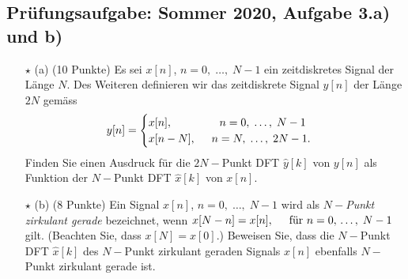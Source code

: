 \documentclass[11pt]{article}
\begin{document}
\subsection*{Prüfungsaufgabe: Sommer 2020, Aufgabe 3.a) und b)}
\vspace*{-0.5cm}
\begin{itemize}
    \item[$\star$ (a)] (10 Punkte) Es sei $x[n]$, $n=0, \; \dots, \; N-1$ ein zeitdiskretes Signal der Länge $N$. Des Weiteren definieren wir das zeitdiskrete Signal $y[n]$ der Länge $2N$ gemäss
    $$ y[n] = \begin{cases}
        x[n], \hspace{1.5cm} n = 0, \; \dots, \; N-1 \\
        x[n-N], \hspace{0.5cm} n = N, \; \dots, \; 2N-1.
    \end{cases} $$
    Finden Sie einen Ausdruck für die $2N-$Punkt DFT $\hat{y}[k]$ von $y[n]$ als Funktion der $N-$Punkt DFT $\hat{x}[k]$ von $x[n]$.
    \item[$\star$ (b)] (8 Punkte) Ein Signal  $x[n]$, $n=0, \; \dots, \; N-1$ wird als $N-$\textit{Punkt zirkulant gerade} bezeichnet, wenn $x[N-n] = x[n], \hspace{0.5cm} \text{für } n= 0, \, \dots, \; N-1$ gilt. (Beachten Sie, dass $x[N] = x[0]$.) Beweisen Sie, dass die $N-$Punkt DFT $\hat{x}[k]$ des $N-$Punkt zirkulant geraden Signals $x[n]$ ebenfalls $N-$Punkt zirkulant gerade ist.
\end{itemize}

\pagebreak

\end{document}

